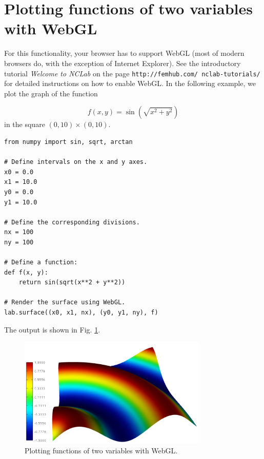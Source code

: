 \documentclass{article}
\begin{document}
\section{Plotting functions of two variables with WebGL}

For this functionality, your browser has to support WebGL (most of modern browsers do, 
with the exception of Internet Explorer). See the introductory tutorial {\em Welcome to NCLab}
on the page {\tt http://femhub.com/ nclab-tutorials/} for detailed instructions on how to enable WebGL. 
In the following example, we plot the graph of the function 

$$
  f(x, y) = \sin(\sqrt{x^2 + y^2})
$$
in the square $(0, 10) \times (0, 10)$.

\begin{verbatim}
from numpy import sin, sqrt, arctan

# Define intervals on the x and y axes.
x0 = 0.0
x1 = 10.0
y0 = 0.0
y1 = 10.0

# Define the corresponding divisions.
nx = 100
ny = 100

# Define a function:
def f(x, y):
    return sin(sqrt(x**2 + y**2))

# Render the surface using WebGL.
lab.surface((x0, x1, nx), (y0, y1, ny), f)
\end{verbatim}
The output is shown in Fig. \ref{fig:webgl}.

\begin{figure}[!ht]
\begin{center}
\includegraphics[width=0.8\textwidth]{img/webgl.png}
\end{center}
\vspace{-2mm}
\caption{Plotting functions of two variables with WebGL.}
\label{fig:webgl}
\end{figure}
\end{document}
